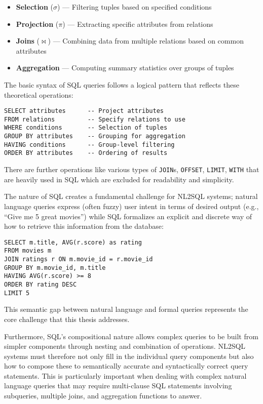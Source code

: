 \begin{itemize}
    \item \textbf{Selection} ($\sigma$) — Filtering tuples based on specified conditions
    \item \textbf{Projection} ($\pi$) — Extracting specific attributes from relations
    \item \textbf{Joins} ($\bowtie$) — Combining data from multiple relations based on common attributes
    \item \textbf{Aggregation} — Computing summary statistics over groups of tuples
\end{itemize}

The basic syntax of SQL queries follows a logical pattern that reflects these theoretical operations:

\begin{verbatim}
SELECT attributes      -- Project attributes
FROM relations         -- Specify relations to use
WHERE conditions       -- Selection of tuples
GROUP BY attributes    -- Grouping for aggregation
HAVING conditions      -- Group-level filtering
ORDER BY attributes    -- Ordering of results
\end{verbatim}

There are further operations like various types of \texttt{JOIN}s, \texttt{OFFSET}, \texttt{LIMIT}, \texttt{WITH}
that are heavily used in SQL which are excluded for readability and simplicity.

The nature of SQL creates a fundamental challenge for NL2SQL systems; natural language queries express (often fuzzy) user
intent in terms of desired output (e.g., ``Give me 5 great movies'') while SQL formalizes an explicit and discrete way
of how to retrieve this information from the database:

\begin{verbatim}
SELECT m.title, AVG(r.score) as rating
FROM movies m
JOIN ratings r ON m.movie_id = r.movie_id
GROUP BY m.movie_id, m.title
HAVING AVG(r.score) >= 8
ORDER BY rating DESC
LIMIT 5
\end{verbatim}

This semantic gap between natural language and formal queries represents the core challenge that this thesis addresses.

Furthermore, SQL's compositional nature allows complex queries to be built from simpler components through nesting and
combination of operations. NL2SQL systems must therefore not only fill in the individual query components but also how
to compose these to semantically accurate and syntactically correct query statements. This is particularly important when
dealing with complex natural language queries that may require multi-clause SQL statements involving subqueries, multiple
joins, and aggregation functions to answer.

